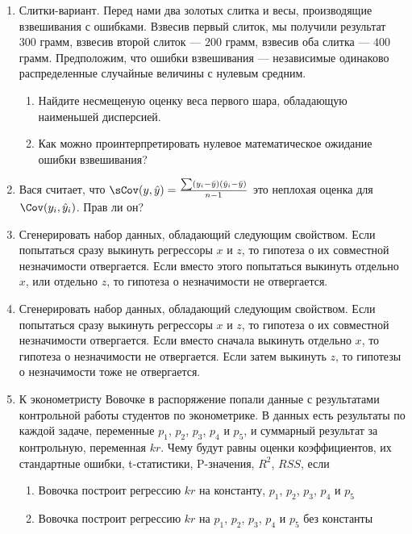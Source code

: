 \documentclass[pdftex,12pt,a4paper]{article}
\def \hy{\hat{y}}
\newcommand{\solution}[1]{}
\newcommand{\problem}[1]{#1}
\begin{document}
\begin{enumerate}
\solution{Вроде бы равносильно переносу начала координат и применению результата для регрессии без свободного члена. Должна остаться несмещенность. }




\item \problem{ Слитки-вариант. Перед нами два золотых слитка и весы, производящие взвешивания с ошибками. Взвесив первый слиток, мы получили результат $300$ грамм, взвесив второй слиток --- $200$ грамм, взвесив оба слитка --- $400$ грамм. Предположим, что ошибки взвешивания --- независимые одинаково распределенные случайные величины с нулевым средним. 
\begin{enumerate}
\item Найдите несмещеную оценку веса первого шара, обладающую наименьшей дисперсией.
\item Как можно проинтерпретировать нулевое математическое ожидание ошибки взвешивания? 
\end{enumerate} }
\solution{ Как отсутствие систематической ошибки.} 

\item Вася считает, что $\sCov(y,\hy)=\frac{\sum (y_i-\bar{y})(\hy_i-\bar{y})}{n-1}$ это неплохая оценка для $\Cov(y_i,\hy_i)$. Прав ли он?
\solution{Не прав. Ковариация $\Cov(y_i,\hy_i)$ зависит от $i$, это не одно неизвестное число, для которого можно предложить одну оценку.}


\item Сгенерировать набор данных, обладающий следующим свойством. Если попытаться сразу выкинуть регрессоры $x$ и $z$, то гипотеза о их совместной незначимости отвергается. Если вместо этого попытаться выкинуть отдельно $x$, или отдельно $z$, то гипотеза о незначимости не отвергается.
\solution{Сгенерировать сильно коррелированные $x$ и $z$}


\item Сгенерировать набор данных, обладающий следующим свойством. Если попытаться сразу выкинуть регрессоры $x$ и $z$, то гипотеза о их совместной незначимости отвергается. Если вместо сначала выкинуть отдельно $x$, то гипотеза о незначимости не отвергается. Если затем выкинуть $z$, то гипотезы о незначимости тоже не отвергается.
\solution{??}

\item К эконометристу Вовочке в распоряжение попали данные с результатами контрольной работы студентов по эконометрике. В данных есть результаты по каждой задаче, переменные $p_1$, $p_2$, $p_3$, $p_4$ и $p_5$, и суммарный результат за контрольную, переменная $kr$. Чему будут равны оценки коэффициентов, их стандартные ошибки, t-статистики, P-значения, $R^2$, $RSS$, если
\begin{enumerate}
\item Вовочка построит регрессию $kr$ на константу, $p_1$, $p_2$, $p_3$, $p_4$ и $p_5$
\item Вовочка построит регрессию $kr$ на $p_1$, $p_2$, $p_3$, $p_4$ и $p_5$ без константы
\end{enumerate}
\solution{}



\end{enumerate}
\end{document}
